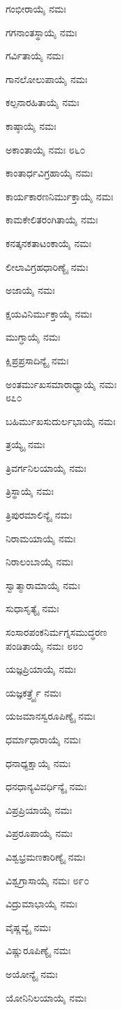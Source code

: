 ಗಂಭೀರಾಯೈ ನಮಃ

ಗಗನಾಂತಸ್ಥಾಯೈ ನಮಃ

ಗರ್ವಿತಾಯೈ ನಮಃ

ಗಾನಲೋಲುಪಾಯೈ ನಮಃ

ಕಲ್ಪನಾರಹಿತಾಯೈ ನಮಃ

ಕಾಷ್ಠಾಯೈ ನಮಃ

ಅಕಾಂತಾಯೈ ನಮಃ \num{೮೬೦}

ಕಾಂತಾರ್ಧವಿಗ್ರಹಾಯೈ ನಮಃ

ಕಾರ್ಯಕಾರಣನಿರ್ಮುಕ್ತಾಯೈ ನಮಃ

ಕಾಮಕೇಲಿತರಂಗಿತಾಯೈ ನಮಃ

ಕನತ್ಕನಕತಾಟಂಕಾಯೈ ನಮಃ

ಲೀಲಾವಿಗ್ರಹಧಾರಿಣ್ಯೈ ನಮಃ

ಅಜಾಯೈ ನಮಃ

ಕ್ಷಯವಿನಿರ್ಮುಕ್ತಾಯೈ ನಮಃ

ಮುಗ್ಧಾಯೈ ನಮಃ

ಕ್ಷಿಪ್ರಪ್ರಸಾದಿನ್ಯೈ ನಮಃ

ಅಂತರ್ಮುಖಸಮಾರಾಧ್ಯಾಯೈ ನಮಃ\\\num{೮೭೦}

ಬಹಿರ್ಮುಖಸುದುರ್ಲಭಾಯೈ ನಮಃ

ತ್ರಯ್ಯೈ ನಮಃ

ತ್ರಿವರ್ಗನಿಲಯಾಯೈ ನಮಃ

ತ್ರಿಸ್ಥಾಯೈ ನಮಃ

ತ್ರಿಪುರಮಾಲಿನ್ಯೈ ನಮಃ

ನಿರಾಮಯಾಯೈ ನಮಃ

ನಿರಾಲಂಬಾಯೈ ನಮಃ

ಸ್ವಾತ್ಮಾರಾಮಾಯೈ ನಮಃ

ಸುಧಾಸೃತ್ಯೈ ನಮಃ

ಸಂಸಾರಪಂಕನಿರ್ಮಗ್ನಸಮುದ್ಧರಣ\\ಪಂಡಿತಾಯೈ ನಮಃ \num{೮೮೦}

ಯಜ್ಞಪ್ರಿಯಾಯೈ ನಮಃ

ಯಜ್ಞಕರ್ತ್ರ್ಯೈ ನಮಃ

ಯಜಮಾನಸ್ವರೂಪಿಣ್ಯೈ ನಮಃ

ಧರ್ಮಾಧಾರಾಯೈ ನಮಃ

ಧನಾಧ್ಯಕ್ಷಾಯೈ ನಮಃ

ಧನಧಾನ್ಯವಿವರ್ಧಿನ್ಯೈ ನಮಃ

ವಿಪ್ರಪ್ರಿಯಾಯೈ ನಮಃ

ವಿಪ್ರರೂಪಾಯೈ ನಮಃ

ವಿಶ್ವಭ್ರಮಣಕಾರಿಣ್ಯೈ ನಮಃ

ವಿಶ್ವಗ್ರಾಸಾಯೈ ನಮಃ \num{೮೯೦}

ವಿದ್ರುಮಾಭಾಯೈ ನಮಃ

ವೈಷ್ಣವ್ಯೈ ನಮಃ

ವಿಷ್ಣುರೂಪಿಣ್ಯೈ ನಮಃ

ಅಯೋನ್ಯೈ ನಮಃ

ಯೋನಿನಿಲಯಾಯೈ ನಮಃ

